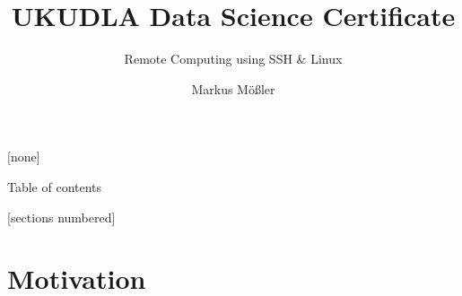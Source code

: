 \documentclass[10pt,aspectratio=169]{beamer}
\title{UKUDLA Data Science Certificate}
\subtitle{Remote Computing using SSH \& Linux}
\author{Markus Mößler}
\institute{University of Hohenheim}
\begin{document}
\maketitle

{
[none]

\begin{frame}[noframenumbering]{Table of contents}

  \small
  [sections numbered]
  \tableofcontents[hideallsubsections]

\end{frame}
}



\section{Motivation}
\end{document}
